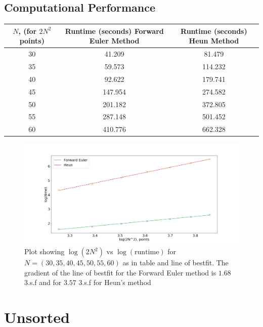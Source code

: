 \section{Computational Performance}
\begin{tabular}{|c|c|c|}
	\hline 
	$N$, (for $2N^2$ points) & Runtime (seconds) Forward Euler Method & Runtime (seconds) Heun Method \\ 
	\hline 
	30 & 41.209 & 81.479 \\ 
	\hline 
	35 & 59.573 & 114.232 \\ 
	\hline 
	40 & 92.622 & 179.741 \\ 
	\hline 
	45 & 147.954 & 274.582 \\ 
	\hline 
	50 & 201.182 & 372.805 \\ 
	\hline 
	55 & 287.148 & 501.452 \\ 
	\hline 
	60 & 410.776 & 662.328 \\ 
	\hline 
\end{tabular} 
\begin{figure}[h!]
	\centering
	\includegraphics[width=\linewidth]{evaluation/performance_loglog_plot}
	\caption[Time stepping performance based on number of points initialised in the domain]{Plot showing $\log(2N^2)$ vs $\log(\textrm{runtime})$ for $N = (30,35,40,45,50,55,60)$ as in table and line of bestfit. The gradient of the line of bestfit for the Forward Euler method is $1.68$ 3.s.f and for $3.57$ 3.s.f for Heun's method}
	\label{fig:performanceloglogplot}
\end{figure}
\chapter{Unsorted}
